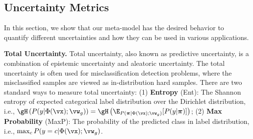 \subsection{Uncertainty Metrics} \label{sec:metric}
In this section, we show that our meta-model has the desired behavior to quantify different uncertainties and how they can be used in various applications.


\textbf{Total Uncertainty.} 
Total uncertainty, also known as predictive uncertainty, is a combination of epistemic uncertainty and aleatoric uncertainty. The total uncertainty is often used for misclassification detection problems, where the misclassified samples are viewed as in-distribution hard samples. There are two standard ways to measure total uncertainty: (1) \textbf{Entropy} (Ent): The Shannon entropy of expected categorical label distribution over the Dirichlet distribution, i.e., $\gH\left(P(y|\Phi(\vx); \vw_g) \right) = \gH\left(\E_{P(\boldsymbol{\pi}|\Phi(\vx); \vw_g)}[P(y|\boldsymbol{\pi})]\right)
$; (2) \textbf{Max Probability} (MaxP): The probability of the predicted class in label distribution, i.e., $\max_c P(y=c|\Phi(\vx); \vw_g)$.

